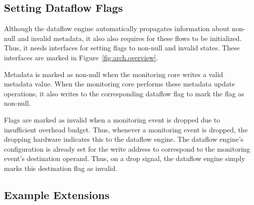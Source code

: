 \subsection{Setting Dataflow Flags}
\label{sec:arch.dropping}

Although the dataflow engine automatically propagates information about
non-null and invalid metadata, it also also requires for these flows to be
initialized. Thus, it needs interfaces for setting flags to non-null and
invalid states. These interfaces are marked in Figure~\ref{fig:arch.overview}.

Metadata is marked as non-null when the monitoring core writes a valid metadata
value. When the monitoring core performs these metadata update operations, it
also writes to the corresponding dataflow flag to mark the flag as non-null.

Flags are marked as invalid when a monitoring event is dropped due to
insufficient overhead budget. Thus, whenever a monitoring event is dropped, the
dropping hardware indicates this to the dataflow engine. The dataflow engine's
configuration is already set for the write address to correspond to the
monitoring event's destination operand. Thus, on a drop signal, the dataflow
engine simply marks this destination flag as invalid.

\subsection{Example Extensions}
